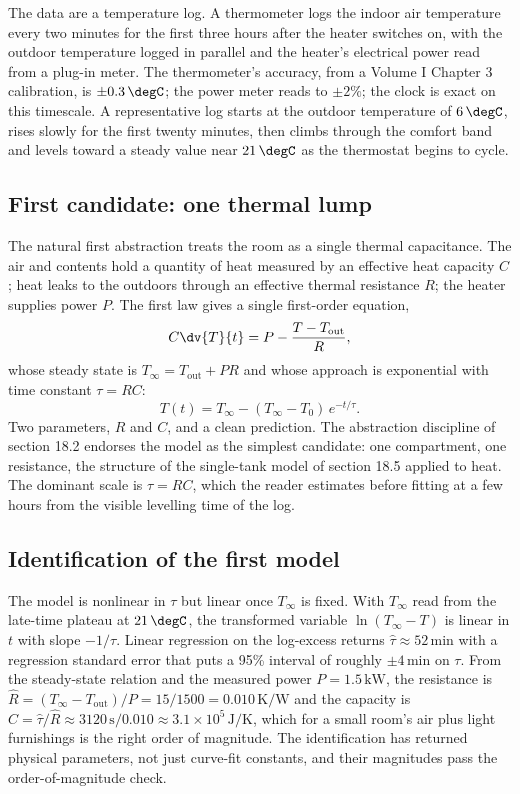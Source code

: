 The data are a temperature log. A thermometer logs the indoor air
temperature every two minutes for the first three hours after the heater
switches on, with the outdoor temperature logged in parallel and the
heater's electrical power read from a plug-in meter. The thermometer's
accuracy, from a Volume I Chapter 3 calibration, is $\pm 0.3\,\degC$;
the power meter reads to $\pm 2\%$; the clock is exact on this
timescale. A representative log starts at the outdoor temperature of
$6\,\degC$, rises slowly for the first twenty minutes, then climbs
through the comfort band and levels toward a steady value near
$21\,\degC$ as the thermostat begins to cycle.

\subsection{First candidate: one thermal lump}

The natural first abstraction treats the room as a single thermal
capacitance. The air and contents hold a quantity of heat measured by an
effective heat capacity $C$; heat leaks to the outdoors through an
effective thermal resistance $R$; the heater supplies power $P$. The
first law gives a single first-order equation,
\[
C \dv{T}{t} = P - \frac{T - T_{\text{out}}}{R},
\]
whose steady state is $T_\infty = T_{\text{out}} + PR$ and whose
approach is exponential with time constant $\tau = RC$:
\[
T(t) = T_\infty - (T_\infty - T_0)\, e^{-t/\tau}.
\]
Two parameters, $R$ and $C$, and a clean prediction. The abstraction
discipline of section 18.2 endorses the model as the simplest candidate:
one compartment, one resistance, the structure of the single-tank model
of section 18.5 applied to heat. The dominant scale is $\tau = RC$,
which the reader estimates before fitting at a few hours from the visible
levelling time of the log.

\subsection{Identification of the first model}

The model is nonlinear in $\tau$ but linear once $T_\infty$ is fixed.
With $T_\infty$ read from the late-time plateau at $21\,\degC$, the
transformed variable $\ln(T_\infty - T)$ is linear in $t$ with slope
$-1/\tau$. Linear regression on the log-excess returns
$\hat\tau \approx 52\,\text{min}$ with a regression standard error that
puts a 95\% interval of roughly $\pm 4\,\text{min}$ on $\tau$. From the
steady-state relation and the measured power $P = 1.5\,\text{kW}$, the
resistance is $\hat R = (T_\infty - T_{\text{out}})/P = 15/1500 =
0.010\,\si{\kelvin\per\watt}$ and the capacity is $\hat C = \hat\tau/\hat
R \approx 3120\,\text{s} / 0.010 \approx 3.1\times 10^{5}\,\si{\joule\per\kelvin}$,
which for a small room's air plus light furnishings is the right order
of magnitude. The identification has returned physical parameters, not
just curve-fit constants, and their magnitudes pass the
order-of-magnitude check.

